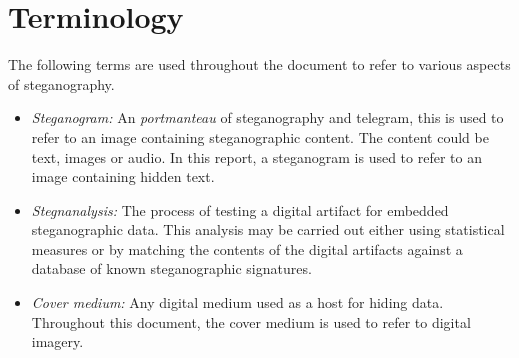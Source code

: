 \section{Terminology}
The following terms are used throughout the document to refer to various aspects of steganography. 
\begin{itemize}
\item{\emph{Steganogram:}} An \emph{portmanteau} of steganography and telegram, this is used to refer to an image containing steganographic content. The content could be text, images or audio. In this report, a steganogram is used to refer to an image containing hidden text.
\item{\emph{Stegnanalysis:}} The process of testing a digital artifact for embedded steganographic data. This analysis may be carried out either using statistical measures or by matching the contents of the digital artifacts against a database of known steganographic signatures.
\item{\emph{Cover medium:}} Any digital medium used as a host for hiding data. Throughout this document, the cover medium is used to refer to digital imagery.
\end{itemize}

